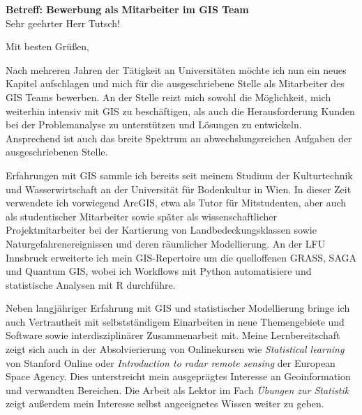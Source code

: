 \documentclass[11pt,a4paper,sans]{moderncv}        %
\begin{document}

\date{18. Dezember 2017}
\opening{\textbf{Betreff: Bewerbung als Mitarbeiter im GIS Team} \\[0.5cm]     Sehr geehrter Herr Tutsch!}
\closing{Mit besten Gr\"{u}{\ss}en,}

\makelettertitle
\justify
\vspace{-0.5cm} %

Nach mehreren Jahren der T\"atigkeit an Universit\"aten m\"ochte ich nun ein neues Kapitel aufschlagen und mich f\"ur die ausgeschriebene Stelle als Mitarbeiter des GIS Teams bewerben. An der Stelle reizt mich sowohl die M\"oglichkeit, mich weiterhin intensiv mit GIS zu besch\"aftigen, als auch die Herausforderung Kunden bei der Problemanalyse zu unterst\"utzen und L\"osungen zu entwickeln. Ansprechend ist auch das breite Spektrum an abwechslungsreichen Aufgaben der ausgeschriebenen Stelle. 


Erfahrungen mit GIS sammle ich bereits seit meinem Studium der Kulturtechnik und Wasserwirtschaft an der Universit\"at f\"ur Bodenkultur in Wien. In dieser Zeit verwendete ich vorwiegend ArcGIS, etwa als Tutor f\"ur Mitstudenten, aber auch als studentischer Mitarbeiter sowie sp\"ater als wissenschaftlicher Projektmitarbeiter bei der Kartierung von Landbedeckungsklassen sowie Naturgefahrenereignissen und deren r\"aumlicher Modellierung. An der LFU Innsbruck erweiterte ich mein GIS-Repertoire um die quelloffenen GRASS, SAGA und Quantum GIS, wobei ich Workflows mit Python automatisiere und statistische Analysen mit R durchf\"uhre.

Neben langj\"ahriger Erfahrung mit GIS und statistischer Modellierung bringe ich auch Vertrautheit mit selbstst\"andigem Einarbeiten in neue Themengebiete und Software sowie interdisziplin\"arer Zusammenarbeit mit. Meine Lernbereitschaft zeigt sich auch in der  Absolvierierung von Onlinekursen wie \emph{Statistical learning} von Stanford Online oder \emph{Introduction to radar remote sensing} der European Space Agency. Dies unterstreicht mein ausgepr\"agtes Interesse an Geoinformation und verwandten Bereichen. Die Arbeit als Lektor im Fach \emph{\"Ubungen zur Statistik} zeigt au{\ss}erdem mein Interesse selbst angeeignetes Wissen weiter zu geben.
\end{document}
